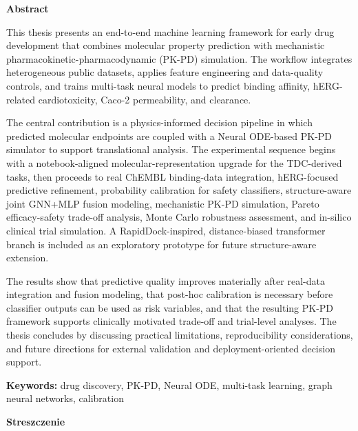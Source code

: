 \documentclass[a4paper,11pt,twoside]{report}
\newcommand{\frontmatterheading}[1]{%
  \begin{center}
    {\Large\bfseries #1\par}
  \end{center}
  \vspace{1.5\baselineskip}
}
\begin{document}


\pagestyle{empty}
\frontmatterheading{Abstract}

\begin{singlespace}
\fontsize{12pt}{14.4pt}\selectfont

This thesis presents an end-to-end machine learning framework for early drug development that combines molecular property prediction with mechanistic pharmacokinetic-pharmacodynamic (PK-PD) simulation. The workflow integrates heterogeneous public datasets, applies feature engineering and data-quality controls, and trains multi-task neural models to predict binding affinity, hERG-related cardiotoxicity, Caco-2 permeability, and clearance.

The central contribution is a physics-informed decision pipeline in which predicted molecular endpoints are coupled with a Neural ODE-based PK-PD simulator to support translational analysis. The experimental sequence begins with a notebook-aligned molecular-representation upgrade for the TDC-derived tasks, then proceeds to real ChEMBL binding-data integration, hERG-focused predictive refinement, probability calibration for safety classifiers, structure-aware joint GNN+MLP fusion modeling, mechanistic PK-PD simulation, Pareto efficacy-safety trade-off analysis, Monte Carlo robustness assessment, and in-silico clinical trial simulation. A RapidDock-inspired, distance-biased transformer branch is included as an exploratory prototype for future structure-aware extension.

The results show that predictive quality improves materially after real-data integration and fusion modeling, that post-hoc calibration is necessary before classifier outputs can be used as risk variables, and that the resulting PK-PD framework supports clinically motivated trade-off and trial-level analyses. The thesis concludes by discussing practical limitations, reproducibility considerations, and future directions for external validation and deployment-oriented decision support.

\noindent\textbf{Keywords:} drug discovery, PK-PD, Neural ODE, multi-task learning, graph neural networks, calibration

\end{singlespace}

\thispagestyle{empty}
\clearpage

\frontmatterheading{Streszczenie}
\end{document}
